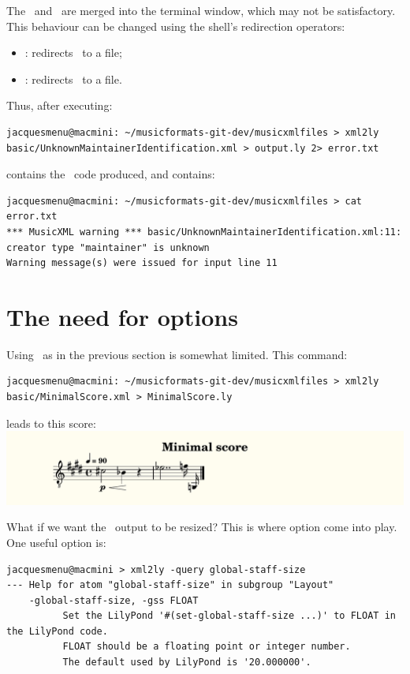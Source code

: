 The \standardOutput\ and \standardError\ are merged into the terminal window, which may not be satisfactory.
This behaviour can be changed using the shell's redirection operators:
\begin{itemize}
\item \code{>}: redirects \standardOutput\ to a file;
\item {}: redirects \standardError\ to a file.
\end{itemize}

Thus, after executing:
\begin{lstlisting}[language=Terminal]
jacquesmenu@macmini: ~/musicformats-git-dev/musicxmlfiles > xml2ly basic/UnknownMaintainerIdentification.xml > output.ly 2> error.txt
\end{lstlisting}

 contains the \lily\ code produced, and  contains:
\begin{lstlisting}[language=Terminal]
jacquesmenu@macmini: ~/musicformats-git-dev/musicxmlfiles > cat error.txt
*** MusicXML warning *** basic/UnknownMaintainerIdentification.xml:11: creator type "maintainer" is unknown
Warning message(s) were issued for input line 11
\end{lstlisting}


\chapter{The need for options}

Using \xmlToLy\ as in the previous section is somewhat limited. This command:
\begin{lstlisting}[language=Terminal]
jacquesmenu@macmini: ~/musicformats-git-dev/musicxmlfiles > xml2ly basic/MinimalScore.xml > MinimalScore.ly
\end{lstlisting}

leads to this score:\\
\includegraphics[scale=0.7]{../mfgraphics/mfgraphicsMinimalScoreAtDefaultSize.png}

What if we want the \lily\ output to be resized? This is where option come into play. One useful option is:
\begin{lstlisting}[language=Terminal]
jacquesmenu@macmini > xml2ly -query global-staff-size
--- Help for atom "global-staff-size" in subgroup "Layout"
    -global-staff-size, -gss FLOAT
          Set the LilyPond '#(set-global-staff-size ...)' to FLOAT in the LilyPond code.
          FLOAT should be a floating point or integer number.
          The default used by LilyPond is '20.000000'.
\end{lstlisting}

